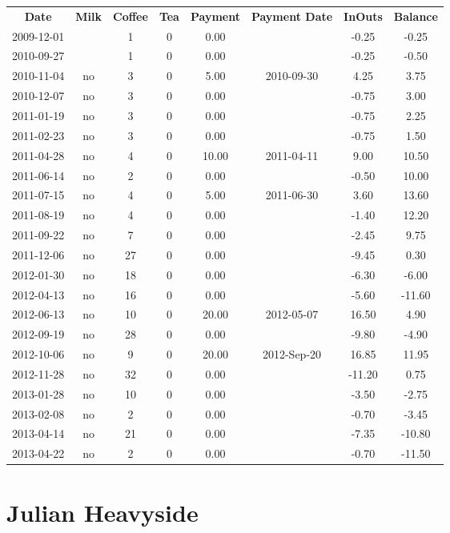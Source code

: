 \begin{center}
\begin{tabular}{cccccccc}
\textbf{Date} & \textbf{Milk} & \textbf{Coffee} & \textbf{Tea} & \textbf{Payment} & \textbf{Payment Date} & \textbf{InOuts} & \textbf{Balance} \\
2009-12-01 &  &  1 & 0 &  0.00 &  &  -0.25 &  -0.25\\ 
2010-09-27 &  &  1 & 0 &  0.00 &  &  -0.25 &  -0.50\\ 
2010-11-04 & no &  3 & 0 &  5.00 & 2010-09-30 &   4.25 &   3.75\\ 
2010-12-07 & no &  3 & 0 &  0.00 &  &  -0.75 &   3.00\\ 
2011-01-19 & no &  3 & 0 &  0.00 &  &  -0.75 &   2.25\\ 
2011-02-23 & no &  3 & 0 &  0.00 &  &  -0.75 &   1.50\\ 
2011-04-28 & no &  4 & 0 & 10.00 & 2011-04-11 &   9.00 &  10.50\\ 
2011-06-14 & no &  2 & 0 &  0.00 &  &  -0.50 &  10.00\\ 
2011-07-15 & no &  4 & 0 &  5.00 & 2011-06-30 &   3.60 &  13.60\\ 
2011-08-19 & no &  4 & 0 &  0.00 &  &  -1.40 &  12.20\\ 
2011-09-22 & no &  7 & 0 &  0.00 &  &  -2.45 &   9.75\\ 
2011-12-06 & no & 27 & 0 &  0.00 &  &  -9.45 &   0.30\\ 
2012-01-30 & no & 18 & 0 &  0.00 &  &  -6.30 &  -6.00\\ 
2012-04-13 & no & 16 & 0 &  0.00 &  &  -5.60 & -11.60\\ 
2012-06-13 & no & 10 & 0 & 20.00 & 2012-05-07 &  16.50 &   4.90\\ 
2012-09-19 & no & 28 & 0 &  0.00 &  &  -9.80 &  -4.90\\ 
2012-10-06 & no &  9 & 0 & 20.00 & 2012-Sep-20 &  16.85 &  11.95\\ 
2012-11-28 & no & 32 & 0 &  0.00 &  & -11.20 &   0.75\\ 
2013-01-28 & no & 10 & 0 &  0.00 &  &  -3.50 &  -2.75\\ 
2013-02-08 & no &  2 & 0 &  0.00 &  &  -0.70 &  -3.45\\ 
2013-04-14 & no & 21 & 0 &  0.00 &  &  -7.35 & -10.80\\ 
2013-04-22 & no &  2 & 0 &  0.00 &  &  -0.70 & -11.50
\end{tabular}
\end{center}

\section{Julian Heavyside}

